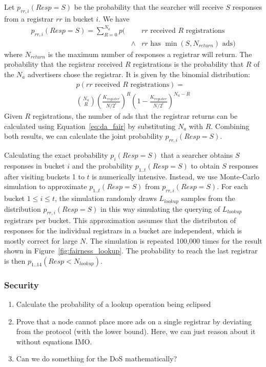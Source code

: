 Let $p_{rr,i}(Resp=S)$ be the probability that the searcher will receive $S$ responses from a registrar $rr$ in bucket $i$. We have
\begin{eqnarray*}
p_{rr,i}(Resp=S) =\sum_{R=0}^{N_a}{} p(  & & \mbox{$rr$ received $R$ registrations}\\
                        & \wedge &  \mbox{$rr$ has $\min(S,N_{return})$ ads})
\end{eqnarray*}
where $N_{return}$ is the maximum number of responses a registrar will return. The probability that the registrar received $R$ registrations is the probability that $R$ of the $N_a$ advertisers chose the registrar. It is given by the binomial distribution:
\begin{eqnarray*}
p(\mbox{$rr$ received $R$ registrations}) = \\
\binom{N_a}{R} \left( \frac{K_{register}}{N/2^i} \right)^R \left(1 - \frac{K_{register}}{N/2^i} \right)^{N_a-R}
\end{eqnarray*}
Given $R$ registrations, the number of ads that the registrar returns can be calculated using Equation~\ref{eq:da_fair} by substituting $N_a$ with $R$. Combining both results, we can calculate the joint probability $p_{rr,i}(Resp=S)$.

Calculating the exact probability $p_{i}(Resp=S)$ that a searcher obtains $S$ responses in bucket $i$ and the probability $p_{1..t}(Resp=S)$ to obtain $S$ responses after visiting buckets 1 to $t$ is numerically intensive.
Instead, we use Monte-Carlo simulation to approximate $p_{1..t}(Resp=S)$ from $p_{rr,i}(Resp=S)$. For each bucket $1\le i \le t$, the simulation randomly draws $L_{lookup}$ samples from the distribution $p_{rr,i}(Resp=S)$ in this way simulating the querying of $L_{lookup}$ registrars per bucket. This approximation assumes that the distributon of responses for the individual registrars in a bucket are independent, which is mostly correct for large $N$. The simulation is repeated 100,000 times for the result shown in Figure~\ref{fig:fairness_lookup}.
The probability to reach the last registrar is then $p_{1..14}(Resp< N_{lookup})$.

\subsubsection{Security}
\begin{enumerate}
    \item Calculate the probability of a lookup operation being eclipsed
    \item Prove that a node cannot place more ads on a single registrar by deviating from the protocol (with the lower bound). Here, we can just reason about it without equations IMO. 
    \item Can we do something for the DoS mathematically?
\end{enumerate}

